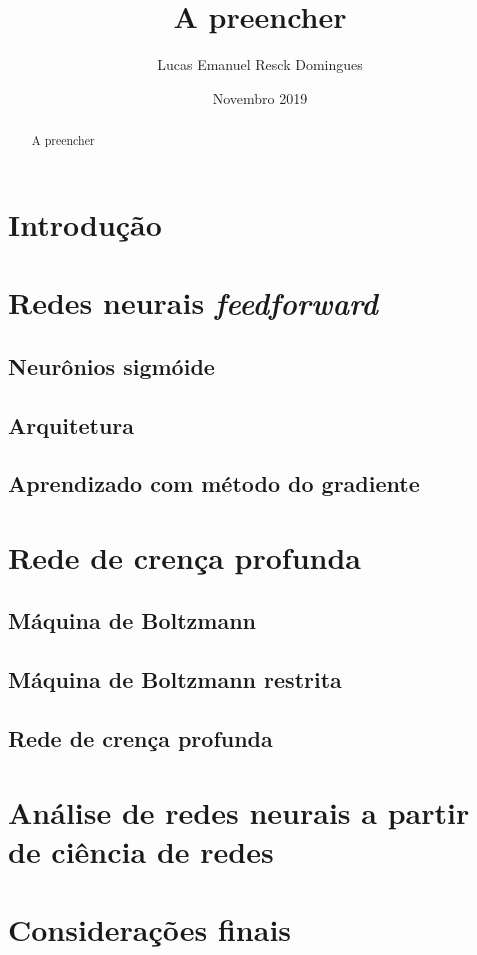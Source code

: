 \documentclass{article}
\title{A preencher}
\author{Lucas Emanuel Resck Domingues}
\date{Novembro 2019}
\begin{document}
    \maketitle

    \begin{abstract}
        A preencher
    \end{abstract}

    \section{Introdução}

    \section{Redes neurais \textit{feedforward}}

        \subsection{Neurônios sigmóide}

        \subsection{Arquitetura}

        \subsection{Aprendizado com método do gradiente}

    \section{Rede de crença profunda}

        \subsection{Máquina de Boltzmann}

        \subsection{Máquina de Boltzmann restrita}

        \subsection{Rede de crença profunda}

    \section{Análise de redes neurais a partir de ciência de redes}

    \section{Considerações finais}

    
    
    \nocite{nielsen2015neural}
    \nocite{testolin2018deep}
\end{document}
